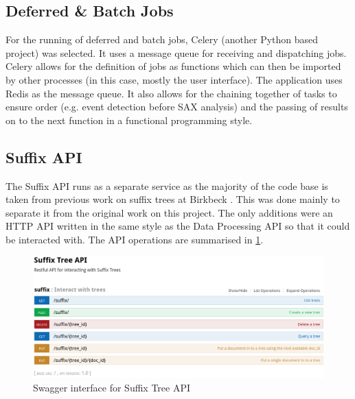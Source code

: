 \documentclass[../report.tex]{subfiles}
\begin{document}
\subsection{Deferred \& Batch Jobs} \label{sec:worker}
	For the running of deferred and batch jobs, Celery (another Python based project) was selected.  It uses a message queue for receiving and dispatching jobs.  Celery allows for the definition of jobs as functions which can then be imported by other processes (in this case, mostly the user interface).  The application uses Redis as the message queue. It also allows for the chaining together of tasks to ensure order (e.g. event detection before SAX analysis) and the passing of results on to the next function in a functional programming style.
	
\subsection{Suffix API}
	The Suffix API runs as a separate service as the majority of the code base is taken from previous work on suffix trees at Birkbeck \citep{bbk-suffix}.  This was done mainly to separate it from the original work on this project.  The only additions were an HTTP API written in the same style as the Data Processing API so that it could be interacted with.  The API operations are summarised in \cref{fig:suffix-api}.

\begin{figure}[ht]
	\centering
	\includegraphics[width=1\linewidth]{img/suffix-api}
	\caption{Swagger interface for Suffix Tree API}
	\label{fig:suffix-api}
\end{figure}

	
\end{document}
